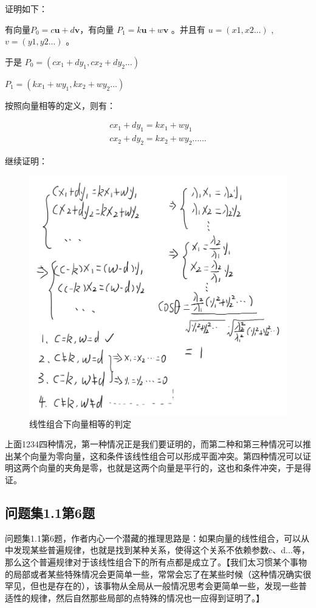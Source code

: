 \documentclass[12pt,oneside]{book}
\begin{document}
证明如下：

有向量$P_0 = c\boldsymbol{u} + d\boldsymbol{v}$，有向量 $P_1 = k\boldsymbol{u} + w\boldsymbol{v}$ 。并且有 $u = (x1, x2...)$ , $v = (y1, y2...)$ 。

于是
$P_0 = (cx_1+dy_1, cx_2+dy_2...)$

$P_1 = (kx_1+wy_1, kx_2+wy_2...)$

按照向量相等的定义，则有：


\begin{align*}
cx_1+dy_1 = kx_1 + wy_1\\
cx_2+dy_2 = kx_2 + wy_2
......
\end{align*}

继续证明：
\begin{figure}[H]
\centering
\includegraphics[width=\linewidth ,totalheight=0.95\textheight , keepaspectratio]{线性组合下向量相等的判定.png}
\caption{线性组合下向量相等的判定}
\end{figure}

上面1234四种情况，第一种情况正是我们要证明的，而第二种和第三种情况可以推出某个向量为零向量，这和条件该线性组合可以形成平面冲突。第四种情况可以证明这两个向量的夹角是零，也就是这两个向量是平行的，这也和条件冲突，于是得证。


\subsection{问题集1.1第6题}
\cite{线性代数引论}问题集1.1第6题，作者内心一个潜藏的推理思路是：如果向量的线性组合，可以从中发现某些普遍规律，也就是找到某种关系，使得这个关系不依赖参数c、d...等，那么这个普遍规律对于该线性组合下的所有点都是成立了。【我们太习惯某个事物的局部或者某些特殊情况会更简单一些，常常会忘了在某些时候（这种情况确实很罕见，但也是存在的），该事物从全局从一般情况思考会更简单一些，发现一些普适性的规律，然后自然那些局部的点特殊的情况也一应得到证明了。】
\end{document}
